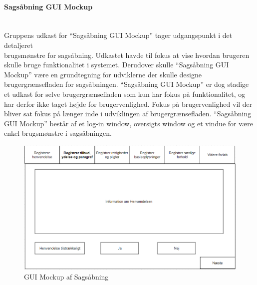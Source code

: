 \documentclass[../../main.tex]{subfiles}
\begin{document}
\paragraph{Sagsåbning GUI Mockup}\mbox{} \\
Gruppens udkast for “Sagsåbning GUI Mockup” tager udgangspunkt i det detaljeret \\ 
brugsmønstre for sagsåbning. Udkastet havde til fokus at vise hvordan brugeren skulle bruge funktionalitet i systemet. Derudover skulle “Sagsåbning GUI Mockup” være en grundtegning for udviklerne der skulle designe brugergrænsefladen for sagsåbningen. “Sagsåbning GUI Mockup” er dog stadige et udkast for selve brugergrænsefladen som kun har fokus på funktionalitet, og har derfor ikke taget højde for brugervenlighed. Fokus på brugervenlighed vil der bliver sat fokus på længer inde i udviklingen af brugergrænsefladen. “Sagsåbning GUI Mockup” består af et log-in window, oversigts window og et vindue for være enkel brugsmønstre i sagsåbningen.


\begin{center}
\begin{figure}[H]
  \centering
  \includegraphics[scale=.5]{figurer/Sags_bning_GUI_Mockup.PNG}
  \caption{GUI Mockup af Sagsåbning}
  \label{fig:forhold_sekvensdiagram}
\end{figure}
\end{center}
\end{document}
